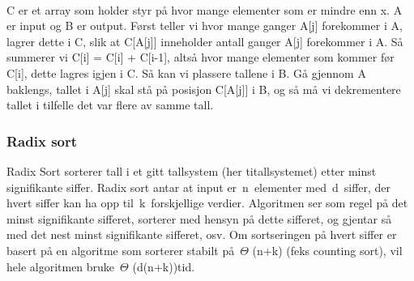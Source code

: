 \documentclass[12pt]{report}
\begin{document}

{\fontsize{13pt}{15.6pt}\selectfont \ \ \ \  \par}\par


\vspace{\baselineskip}

\vspace{\baselineskip}

\vspace{\baselineskip}

\vspace{\baselineskip}

\vspace{\baselineskip}
C er et array som holder styr på hvor mange elementer som er mindre enn x. A er input og B er output. Først teller vi hvor mange ganger A[j] forekommer i A, lagrer dette i C, slik at C[A[j]] inneholder antall ganger A[j] forekommer i A. Så summerer vi C[i] = C[i] + C[i-1], altså hvor mange elementer som kommer før C[i], dette lagres igjen i C. Så kan vi plassere tallene i B. Gå gjennom A baklengs, tallet i A[j] skal stå på posisjon C[A[j]] i B, og så må vi dekrementere tallet i tilfelle det var flere av samme tall. \par


\vspace{\baselineskip}



\newpage

\vspace{\baselineskip}\setlength{\parskip}{6.0pt}
\subsubsection*{Radix sort}
\setlength{\parskip}{0.0pt}
Radix Sort sorterer tall i et gitt tallsystem (her titallsystemet) etter minst signifikante siffer. Radix sort antar at input er n elementer med d siffer, der hvert siffer kan ha opp til k forskjellige verdier. Algoritmen ser som regel på det minst signifikante sifferet, sorterer med hensyn på dette sifferet, og gjentar så med det nest minst signifikante sifferet, osv. Om sortseringen på hvert siffer er basert på en algoritme som sorterer stabilt på $ \Theta $ (n+k) (feks counting sort), vil hele algoritmen bruke $ \Theta $ (d(n+k))tid.\par
\end{document}
